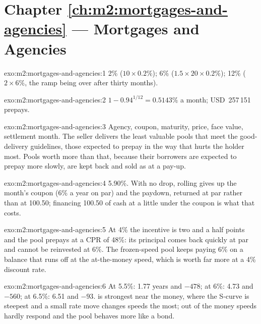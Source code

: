 \section*{Chapter \ref{ch:m2:mortgages-and-agencies} --- Mortgages and Agencies}

\begin{solution}{exo:m2:mortgages-and-agencies:1}
2\% ($10 \times 0.2\%$); 6\% ($1.5 \times 20 \times 0.2\%$); 12\% ($2 \times 6\%$,
the ramp being over after thirty months).
\end{solution}

\begin{solution}{exo:m2:mortgages-and-agencies:2}
$1 - 0.94^{1/12} = 0.5143\%$ a month; USD~257\,151 prepays.
\end{solution}

\begin{solution}{exo:m2:mortgages-and-agencies:3}
Agency, coupon, maturity, price, face value, settlement month. The seller
delivers the least valuable pools that meet the good-delivery guidelines, those
expected to prepay in the way that hurts the holder most. Pools worth more
than that, because their borrowers are expected to prepay more slowly, are kept
back and sold as  at a pay-up.
\end{solution}

\begin{solution}{exo:m2:mortgages-and-agencies:4}
5.90\%. With no drop, rolling gives up the month's coupon (6\% a year on par)
and the paydown, returned at par rather than at 100.50; financing 100.50 of
cash at a little under the coupon is what that costs.
\end{solution}

\begin{solution}{exo:m2:mortgages-and-agencies:5}
At 4\% the incentive is two and a half points and the pool prepays at a CPR of
48\%: its principal comes back quickly at par and cannot be reinvested at 6\%.
The frozen-speed pool keeps paying 6\% on a balance that runs off at the
at-the-money speed, which is worth far more at a 4\% discount rate.
\end{solution}

\begin{solution}{exo:m2:mortgages-and-agencies:6}
At 5.5\%: 1.77 years and $-478$; at 6\%: 4.73 and $-560$; at 6.5\%: 6.51 and
$-93$.  is strongest near the money, where the S-curve is
steepest and a small rate move changes speeds the most; out of the money speeds
hardly respond and the pool behaves more like a bond.
\end{solution}

